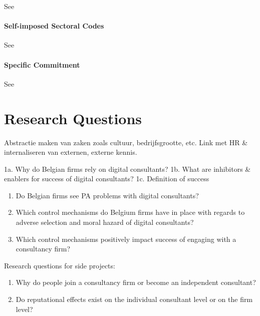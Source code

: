 \documentclass[12pt]{article}
\providecommand{\tightlist}{%
  \setlength{\itemsep}{0pt}\setlength{\parskip}{0pt}}
\begin{document}
See \citet[3-4]{sturdy2021}

\hypertarget{self-imposed-sectoral-codes}{%
\paragraph{Self-imposed Sectoral
Codes}\label{self-imposed-sectoral-codes}}

See \citet[4]{sturdy2021}

\hypertarget{specific-commitment}{%
\paragraph{Specific Commitment}\label{specific-commitment}}

See \citet[12]{sturdy2021}

\hypertarget{research-questions}{%
\section{Research Questions}\label{research-questions}}

Abstractie maken van zaken zoals cultuur, bedrijfsgrootte, etc. Link met
HR \& internaliseren van externen, externe kennis.

1a. Why do Belgian firms rely on digital consultants? 1b. What are
inhibitors \& enablers for success of digital consultants? 1c.
Definition of success

\begin{enumerate}
\def\labelenumi{\arabic{enumi}.}
\setcounter{enumi}{1}
\tightlist
\item
  Do Belgian firms see PA problems with digital consultants?
\item
  Which control mechanisms do Belgium firms have in place with regards
  to adverse selection and moral hazard of digital consultants?
\item
  Which control mechanisms positively impact success of engaging with a
  consultancy firm?
\end{enumerate}

Research questions for side projects:

\begin{enumerate}
\def\labelenumi{\arabic{enumi}.}
\tightlist
\item
  Why do people join a consultancy firm or become an independent
  consultant?
\item
  Do reputational effects exist on the individual consultant level or on
  the firm level?
\end{enumerate}



\end{document}
